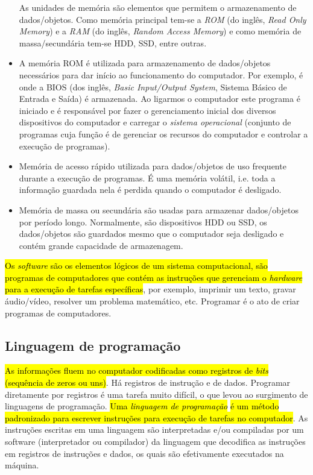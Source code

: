 \begin{itemize}
  As unidades de memória são elementos que permitem o armazenamento de dados/objetos. Como memória principal tem-se a \emph{ROM} (do inglês, \textit{Read Only Memory}) e a \emph{RAM} (do inglês, \textit{Random Access Memory}) e como memória de massa/secundária tem-se HDD, SSD, entre outras.

\item {}

  A memória ROM é utilizada para armazenamento de dados/objetos necessários para dar início ao funcionamento do computador. Por exemplo, é onde a BIOS (dos inglês, \textit{Basic Input/Output System}, Sistema Básico de Entrada e Saída) é armazenada. Ao ligarmos o computador este programa é iniciado e é responsável por fazer o gerenciamento inicial dos diversos dispositivos do computador e carregar o \emph{sistema operacional} (conjunto de programas cuja função é de gerenciar os recursos do computador e controlar a execução de programas).

\item {}

  Memória de acesso rápido utilizada para dados/objetos de uso frequente durante a execução de programas. É uma memória volátil, i.e. toda a informação guardada nela é perdida quando o computador é desligado.

\item {}

  Memória de massa ou secundária são usadas para armazenar dados/objetos por período longo. Normalmente, são dispositivos HDD ou SSD, os dados/objetos são guardados mesmo que o computador seja desligado e contém grande capacidade de armazenagem.   
\end{itemize}

\hl{Os \emph{software} são os elementos lógicos de um sistema computacional, são programas de computadores que contém as instruções que gerenciam o \emph{hardware} para a execução de tarefas específicas}, por exemplo, imprimir um texto, gravar áudio/vídeo, resolver um problema matemático, etc. Programar é o ato de criar programas de computadores.

\subsection{Linguagem de programação}

\hl{As informações fluem no computador codificadas como registros de \textit{bits}}\hl{ (sequência de zeros ou uns)}. Há registros de instrução e de dados. Programar diretamente por registros é uma tarefa muito difícil, o que levou ao surgimento de linguagens de programação. \hl{Uma \emph{linguagem de programação}}\hl{ é um método padronizado para escrever instruções para execução de tarefas no computador}. As instruções escritas em uma linguagem são interpretadas e/ou compiladas por um software (interpretador ou compilador) da linguagem que decodifica as instruções em registros de instruções e dados, os quais são efetivamente executados na máquina.

